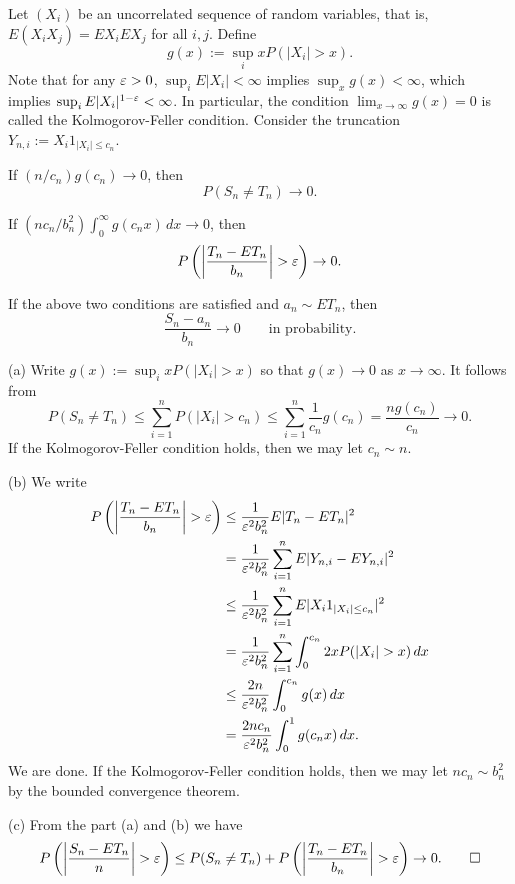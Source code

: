 \documentclass{../../large}
\begin{document}
\begin{prb}
Let $(X_i)$ be an uncorrelated sequence of random variables, that is, $E(X_iX_j)=EX_iEX_j$ for all $i,j$.
Define
\[g(x):=\sup_ixP(|X_i|>x).\]
Note that for any $\varepsilon>0$, $\sup_iE|X_i|<\infty$ implies $\sup_xg(x)<\infty$, which implies $\sup_iE|X_i|^{1-\varepsilon}<\infty$.
In particular, the condition $\lim_{x\to\infty}g(x)=0$ is called the Kolmogorov-Feller condition.
Consider the truncation $Y_{n,i}:=X_i1_{|X_i|\le c_n}$.
\begin{parts}
\item If $(n/c_n)g(c_n)\to0$, then
\[P(S_n\ne T_n)\to0.\]
\item If $(nc_n/b_n^2)\int_0^\infty g(c_nx)\,dx\to0$, then
\[P\left(\left|\frac{T_n-ET_n}{b_n}\right|>\e\right)\to0.\]
\item If the above two conditions are satisfied and $a_n\sim ET_n$, then
\[\frac{S_n-a_n}{b_n}\to0\qquad\text{in probability}.\]
\end{parts}
\end{prb}
\begin{pf}
(a)
Write $g(x):=\sup_ixP(|X_i|>x)$ so that $g(x)\to0$ as $x\to\infty$.
It follows from
\[P(S_n\ne T_n)\le\sum_{i=1}^nP(|X_i|>c_n)\le\sum_{i=1}^n\frac1{c_n}g(c_n)=\frac{ng(c_n)}{c_n}\to0.\]
If the Kolmogorov-Feller condition holds, then we may let $c_n\sim n$.

(b)
We write
\begin{align*}
P\left(\left|\frac{T_n-ET_n}{b_n}\right|>\e\right)
&\le\frac1{\e^2b_n^2}E|T_n-ET_n|^2\\
&=\frac1{\e^2b_n^2}\sum_{i=1}^nE|Y_{n,i}-EY_{n,i}|^2\\
&\le\frac1{\e^2b_n^2}\sum_{i=1}^nE|X_i1_{|X_i|\le c_n}|^2\\
&=\frac1{\e^2b_n^2}\sum_{i=1}^n\int_0^{c_n}2xP(|X_i|>x)\,dx\\
&\le\frac{2n}{\e^2b_n^2}\int_0^{c_n}g(x)\,dx\\
&=\frac{2nc_n}{\e^2b_n^2}\int_0^1g(c_nx)\,dx.
\end{align*}
We are done.
If the Kolmogorov-Feller condition holds, then we may let $nc_n\sim b_n^2$ by the bounded convergence theorem.

(c)
From the part (a) and (b) we have
\[P\left(\left|\frac{S_n-ET_n}n\right|>\e\right)\le P(S_n\ne T_n)+P\left(\left|\frac{T_n-ET_n}{b_n}\right|>\e\right)\to0.\qedhere\]
\end{pf}


\begin{prb}
\end{prb}
\end{document}
